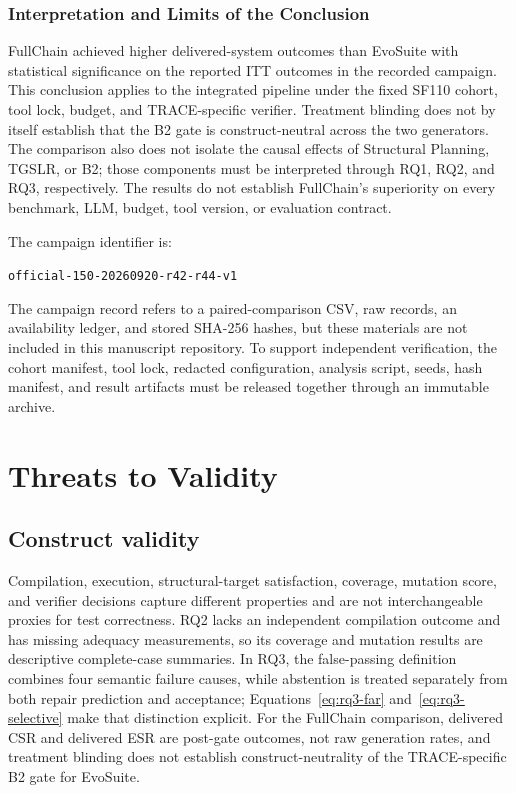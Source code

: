 \documentclass[pdflatex,sn-basic,Numbered,iicol]{sn-jnl}
\begin{document}
\subsubsection{Interpretation and Limits of the Conclusion}\label{subsubsec:fullchain-interpretation}

FullChain achieved higher delivered-system outcomes than EvoSuite with statistical significance on the reported ITT outcomes in the recorded campaign. This conclusion applies to the integrated pipeline under the fixed SF110 cohort, tool lock, budget, and TRACE-specific verifier. Treatment blinding does not by itself establish that the B2 gate is construct-neutral across the two generators. The comparison also does not isolate the causal effects of Structural Planning, TGSLR, or B2; those components must be interpreted through RQ1, RQ2, and RQ3, respectively. The results do not establish FullChain's superiority on every benchmark, LLM, budget, tool version, or evaluation contract.

The campaign identifier is:
\begin{center}
\small\nolinkurl{official-150-20260920-r42-r44-v1}
\end{center}
The campaign record refers to a paired-comparison CSV, raw records, an availability ledger, and stored SHA-256 hashes, but these materials are not included in this manuscript repository. To support independent verification, the cohort manifest, tool lock, redacted configuration, analysis script, seeds, hash manifest, and result artifacts must be released together through an immutable archive.

\section{Threats to Validity}\label{sec:threats}

\subsection{Construct validity}

Compilation, execution, structural-target satisfaction, coverage, mutation score, and verifier decisions capture different properties and are not interchangeable proxies for test correctness. RQ2 lacks an independent compilation outcome and has missing adequacy measurements, so its coverage and mutation results are descriptive complete-case summaries. In RQ3, the false-passing definition combines four semantic failure causes, while abstention is treated separately from both repair prediction and acceptance; Equations~\ref{eq:rq3-far} and~\ref{eq:rq3-selective} make that distinction explicit. For the FullChain comparison, delivered CSR and delivered ESR are post-gate outcomes, not raw generation rates, and treatment blinding does not establish construct-neutrality of the TRACE-specific B2 gate for EvoSuite.
\end{document}
